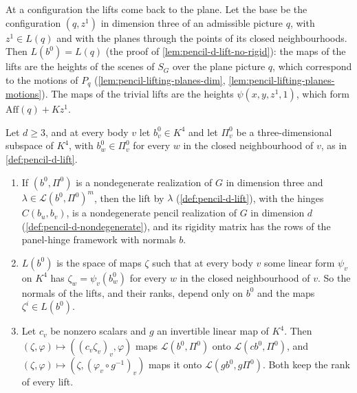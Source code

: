 At a configuration the lifts come back to the plane. Let the base be the
configuration $(q, z^1)$ in dimension three of an admissible picture
$q$, with $z^1 \in L(q)$ and with the planes through the points of its
closed neighbourhoods. Then $L(b^0) = L(q)$ (the proof of
\cref{lem:pencil-d-lift-no-rigid}): the maps of the lifts are the
heights of the scenes of $S_G$ over the plane picture $q$, which
correspond to the motions of $P_q$ (\cref{lem:pencil-lifting-planes-dim},
\cref{lem:pencil-lifting-planes-motions}). The maps of the trivial lifts
are the heights $\psi(x, y, z^1, 1)$, which form
$\mathrm{Aff}(q) + K z^1$.

\begin{lemma}
  \label{lem:pencil-d-lift-realization}
  \leanok
  Let $d \ge 3$, and at every body $v$ let $b^0_v \in K^4$ and let
  $\Pi^0_v$ be a three-dimensional subspace of $K^4$, with
  $b^0_w \in \Pi^0_v$ for every $w$ in the closed neighbourhood of $v$,
  as in \cref{def:pencil-d-lift}.
  \begin{enumerate}
    \item If $(b^0, \Pi^0)$ is a nondegenerate realization of $G$ in
      dimension three and $\lambda \in \mathcal{L}(b^0, \Pi^0)^m$, then
      the lift by $\lambda$ (\cref{def:pencil-d-lift}), with the
      hinges $C(b_u, b_v)$, is a nondegenerate pencil realization of $G$
      in dimension $d$ (\cref{def:pencil-d-nondegenerate}), and its
      rigidity matrix has the rows of the panel-hinge framework with
      normals $b$.
    \item $L(b^0)$ is the space of maps $\zeta$ such that at every body
      $v$ some linear form $\psi_v$ on $K^4$ has $\zeta_w = \psi_v(b^0_w)$
      for every $w$ in the closed neighbourhood of $v$. So the normals of
      the lifts, and their ranks, depend only on $b^0$ and the maps
      $\zeta^i \in L(b^0)$.
    \item Let $c_v$ be nonzero scalars and $g$ an invertible linear map
      of $K^4$. Then $(\zeta, \varphi) \mapsto ((c_v \zeta_v)_v,
      \varphi)$ maps $\mathcal{L}(b^0, \Pi^0)$ onto
      $\mathcal{L}(c b^0, \Pi^0)$, and $(\zeta, \varphi) \mapsto
      (\zeta, (\varphi_v \circ g^{-1})_v)$ maps it onto
      $\mathcal{L}(g b^0, g \Pi^0)$. Both keep the rank of every lift.
  \end{enumerate}
\end{lemma}
